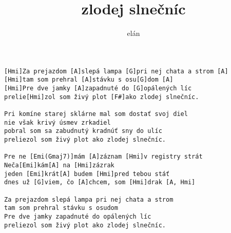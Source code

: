 \author{elán}
\title{zlodej slnečníc}
\maketitle
\begin{verbatim}
[Hmi]Za prejazdom [A]slepá lampa [G]pri nej chata a strom [A]
[Hmi]tam som prehral [A]stávku s osu[G]dom [A]
[Hmi]Pre dve jamky [A]zapadnuté do [G]opálených líc 
prelie[Hmi]zol som živý plot [F#]ako zlodej slnečníc. 

Pri komíne starej sklárne mal som dostať svoj diel 
nie však krivý úsmev zrkadiel 
pobral som sa zabudnutý kradnúť sny do ulíc 
preliezol som živý plot ako zlodej slnečníc. 

Pre ne [Emi(Gmaj7)]mám [A]záznam [Hmi]v registry strát 
Neča[Emi]kám[A] na [Hmi]zázrak 
jeden [Emi]krát[A] budem [Hmi]pred tebou stáť 
dnes už [G]viem, čo [A]chcem, som [Hmi]drak [A, Hmi]

Za prejazdom slepá lampa pri nej chata a strom 
tam som prehral stávku s osudom 
Pre dve jamky zapadnuté do opálených líc 
preliezol som živý plot ako zlodej slnečníc. 

\end{verbatim}
